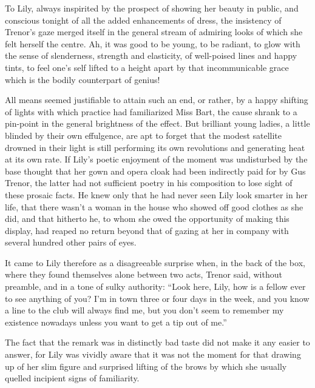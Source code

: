 \documentclass[12pt,a4paper]{book}
\begin{document}
To Lily, always inspirited by the prospect of showing her beauty
in public, and conscious tonight of all the added enhancements of
dress, the insistency of Trenor's gaze merged itself in the
general stream of admiring looks of which she felt herself the
centre. Ah, it was good to be young, to be radiant, to glow with
the sense of slenderness, strength and elasticity, of well-poised
lines and happy tints, to feel one's self lifted to a height
apart by that incommunicable grace which is the bodily
counterpart of genius!





All means seemed justifiable to attain such an end, or rather, by
a happy shifting of lights with which practice had familiarized
Miss Bart, the cause shrank to a pin-point in the general
brightness of the effect. But brilliant young ladies, a little
blinded by their own effulgence, are apt to forget that the
modest satellite drowned in their light is still performing its
own revolutions and generating heat at its own rate. If Lily's
poetic enjoyment of the moment was undisturbed by the base
thought that her gown and opera cloak had been indirectly paid
for by Gus Trenor, the latter had not sufficient poetry in his
composition to lose sight of these prosaic facts. He knew only
that he had never seen Lily look smarter in her life, that there
wasn't a woman in the house who showed off good clothes as she
did, and that hitherto he, to whom she owed the opportunity of
making this display, had reaped no return beyond that of gazing
at her in company with several hundred other pairs of eyes.





It came to Lily therefore as a disagreeable surprise when, in the
back of the box, where they found themselves alone between two
acts, Trenor said, without preamble, and in a tone of sulky
authority: ``Look here, Lily, how is a fellow ever to see anything
of you? I'm in town three or four days in the week, and you know
a line to the club will always find me, but you don't seem to
remember my existence nowadays unless you want to get a tip out
of me.''





The fact that the remark was in distinctly bad taste did not make
it any easier to answer, for Lily was vividly aware that it was
not the moment for that drawing up of her slim figure and
surprised lifting of the brows by which she usually quelled
incipient signs of familiarity.
\end{document}
